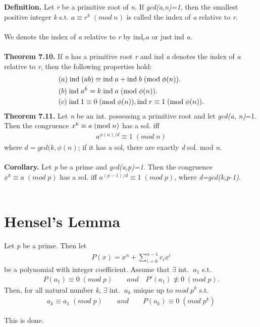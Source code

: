 \documentclass[a4paper,10pt]{article}
\begin{document}
\textbf{Definition.} Let \textit{r} be a primitive root of \textit{n}. If \textit{gcd(a,n)=1}, then the smallest positive integer \textit{k} s.t. \textit{$a\equiv r^{k} \; (mod \; n)$} is called the index of \textit{a} relative to \textit{r}. \\ \\
We denote the index of \textit{a} relative to \textit{r} by ind$_{\textit{r}} \textit{a}$ or just ind \textit{a}. \\ \\
\textbf{Theorem 7.10.} If \textit{n} has a primitive root \textit{r} and ind \textit{a} denotes the index of \textit{a} relative to \textit{r}, then the following properties hold:
\begin{align}
& (a) \; \textnormal{ind} \;(ab)\equiv \textnormal{ind} \; a+\textnormal{ind} \; b \; (\textnormal{mod} \; \phi(n)). \\
& (b) \; \textnormal{ind} \; a^{k}=k \; \textnormal{ind} \; a \; (\textnormal{mod} \; \phi(n)). \\
& (c) \; \textnormal{ind} \; 1\equiv0 \; (\textnormal{mod} \; \phi(n)), \textnormal{ind} \; r\equiv1 \; (\textnormal{mod} \; \phi(n)).
\end{align}
\textbf{Theorem 7.11.} Let \textit{n} be an int. possessing a primitive root and let \textit{gcd(a, n)}=1. Then the congruence \textit{$x^{k}\equiv a \; (\textnormal{mod} \; n)$} has a sol. iff
\begin{align}
a^{\phi(n)/d}\equiv 1 \; (mod \; n)
\end{align}
where \textit{$d=gcd(k,\phi(n)$}; if it has a sol, there are exactly \textit{d} sol. mod \textit{n}. \\ \\
\textbf{Corollary.} Let \textit{p} be a prime and \textit{gcd(a,p)=1}. Then the congruence \textit{$x^{k}\equiv a \; (mod \; p)$} has a sol. iff \textit{$a^{(p-1)/d}\equiv1 \; (mod \; p)$}, where \textit{d=gcd(k,p-1)}. \\ \\

\setcounter{section}{-1}
\section{Hensel's Lemma}
Let \textit{p} be a prime. Then let
\begin{align}
P(x)=x^{n}+\sum_{i=0}^{n-1}{c_{i}x^{i}}
\end{align}
be a polynomial with integer coefficient. Assume that $\exists$ int. $\; a_{1}$ s.t. 
\begin{align}
P(a_{1})\equiv0 \; (mod \; p) \qquad and \quad P'(a_{1})\not\equiv0 \; (mod \; p).
\end{align}
Then, for all natural number \textit{k}, $\exists$ int. $\; a_{k}$ unique up to \textit{$mod \; p^{k}$} s.t. 
\begin{align}
a_{k}\equiv a_{1} \; (mod \; p) \qquad and \qquad P(a_{k})\equiv0 \; (mod \; p^{k})
\end{align}

This is done.
\end{document}

